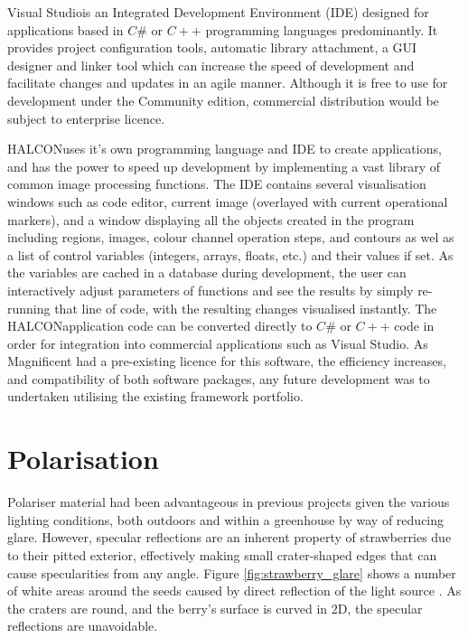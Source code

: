 \documentclass[fleqn,twoside,12pt]{report}
\begin{document}
Visual Studio\textregistered is an Integrated Development Environment (IDE) designed for applications based in $C\#$ or $C++$ programming languages predominantly. It provides project configuration tools, automatic library attachment, a GUI designer and linker tool which can increase the speed of development and facilitate changes and updates in an agile manner. Although it is free to use for development under the Community edition, commercial distribution would be subject to enterprise licence. 

HALCON\texttrademark uses it's own programming language and IDE to create applications, and has the power to speed up development by implementing a vast library of common image processing functions. The IDE contains several visualisation windows such as code editor, current image (overlayed with current operational markers), and a window displaying all the objects created in the program including regions, images, colour channel operation steps, and contours as wel as a list of control variables (integers, arrays, floats, etc.) and their values if set. As the variables are cached in a database during development, the user can interactively adjust parameters of functions and see the results by simply re-running that line of code, with the resulting changes visualised instantly. The HALCON\texttrademark application code can be converted directly to $C\#$ or $C++$ code in order for integration into commercial applications such as Visual Studio\textregistered. As Magnificent had a pre-existing licence for this software, the efficiency increases, and compatibility of both software packages, any future development was to undertaken utilising the existing framework portfolio.


\section{Polarisation}


Polariser material had been advantageous in previous projects given the various lighting conditions, both outdoors and within a greenhouse by way of reducing glare. However, specular reflections are an inherent property of strawberries due to their pitted exterior, effectively making small crater-shaped edges that can cause specularities from any angle. Figure \ref{fig:strawberry_glare} shows a number of white areas around the seeds caused by direct reflection of the light source \cite{gurney}. As the craters are round, and the berry's surface is curved in 2D, the specular reflections are unavoidable.
\end{document}
